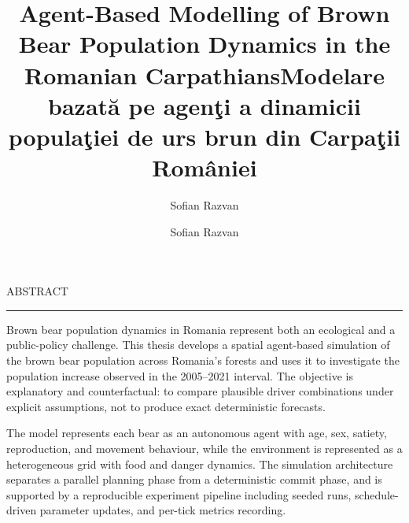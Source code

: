 \documentclass[12pt]{report}
\begin{document}
\title{Agent-Based Modelling of Brown Bear Population Dynamics in the Romanian Carpathians}
\author{Sofian Razvan}

\maketitle

\title{Modelare bazat\u a pe agen\c ti a dinamicii popula\c tiei de urs brun din Carpa\c tii Rom\^aniei}
\author{Sofian Razvan}

\maketitle
{}


\newpage
\thispagestyle{empty}
\mbox{}
\newpage
{} 

\cleardoublepage
ABSTRACT
\vspace{0.5cm}	
\hrule
\vspace{0.5cm}	

Brown bear population dynamics in Romania represent both an ecological and a public-policy challenge. This thesis develops a spatial agent-based simulation of the brown bear population across Romania's forests and uses it to investigate the population increase observed in the 2005--2021 interval. The objective is explanatory and counterfactual: to compare plausible driver combinations under explicit assumptions, not to produce exact deterministic forecasts.

The model represents each bear as an autonomous agent with age, sex, satiety, reproduction, and movement behaviour, while the environment is represented as a heterogeneous grid with food and danger dynamics. The simulation architecture separates a parallel planning phase from a deterministic commit phase, and is supported by a reproducible experiment pipeline including seeded runs, schedule-driven parameter updates, and per-tick metrics recording.
\end{document}
